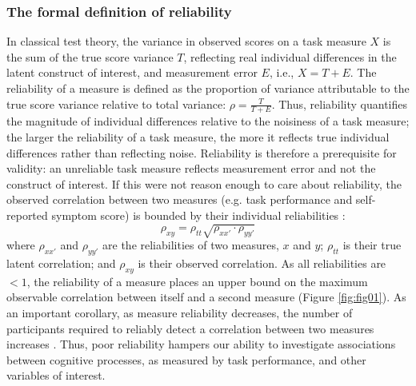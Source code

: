 \documentclass[a4paper,notitlepage,12pt]{article}
\begin{document}
\subsubsection*{The formal definition of reliability}

In classical test theory, the variance in observed scores on a task measure $X$ is the sum of the true score variance $T$, reflecting real individual differences in the latent construct of interest, and measurement error $E$, i.e., $X = T + E$. The reliability of a measure is defined as the proportion of variance attributable to the true score variance relative to total variance: $\rho = \frac{T}{T + E}$. Thus, reliability quantifies the magnitude of individual differences relative to the noisiness of a task measure; the larger the reliability of a task measure, the more it reflects true individual differences rather than reflecting noise. Reliability is therefore a prerequisite for validity: an unreliable task measure reflects measurement error and not the construct of interest. If this were not reason enough to care about reliability, the observed correlation between two measures (e.g. task performance and self-reported symptom score) is bounded by their individual reliabilities \cite{Spearman1904-mo}: 
\begin{equation}
    \rho_{xy} = \rho_{tt} \sqrt{\rho_{xx'} \cdot \rho_{yy'}}
\end{equation}
where $\rho_{xx'}$ and $\rho_{yy'}$ are the reliabilities of two measures, $x$ and $y$; $\rho_{tt}$ is their true latent correlation; and  $\rho_{xy}$ is their observed correlation. As all reliabilities are $<1$, the reliability of a measure places an upper bound on the maximum observable correlation between itself and a second measure (Figure \ref{fig:fig01}). As an important corollary, as measure reliability decreases, the number of participants required to reliably detect a correlation between two measures increases \cite{Parsons2019-jw}. Thus, poor reliability hampers our ability to investigate associations between cognitive processes, as measured by task performance, and other variables of interest. 
\end{document}
